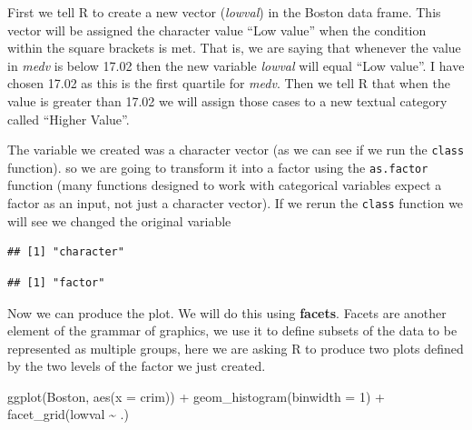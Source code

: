 \documentclass[
]{book}
\newenvironment{Shaded}{\begin{snugshade}}{\end{snugshade}}
\newcommand{\AttributeTok}[1]{\textcolor[rgb]{0.77,0.63,0.00}{#1}}
\newcommand{\DecValTok}[1]{\textcolor[rgb]{0.00,0.00,0.81}{#1}}
\newcommand{\FunctionTok}[1]{\textcolor[rgb]{0.00,0.00,0.00}{#1}}
\newcommand{\NormalTok}[1]{#1}
\newcommand{\OtherTok}[1]{\textcolor[rgb]{0.56,0.35,0.01}{#1}}
\newcommand{\SpecialCharTok}[1]{\textcolor[rgb]{0.00,0.00,0.00}{#1}}
\begin{document}
First we tell R to create a new vector (\emph{lowval}) in the Boston data frame. This vector will be assigned the character value ``Low value'' when the condition within the square brackets is met. That is, we are saying that whenever the value in \emph{medv} is below 17.02 then the new variable \emph{lowval} will equal ``Low value''. I have chosen 17.02 as this is the first quartile for \emph{medv}. Then we tell R that when the value is greater than 17.02 we will assign those cases to a new textual category called ``Higher Value''.

The variable we created was a character vector (as we can see if we run the \texttt{class} function). so we are going to transform it into a factor using the \texttt{as.factor} function (many functions designed to work with categorical variables expect a factor as an input, not just a character vector). If we rerun the \texttt{class} function we will see we changed the original variable

\begin{Shaded}
\end{Shaded}

\begin{verbatim}
## [1] "character"
\end{verbatim}

\begin{Shaded}
\end{Shaded}

\begin{verbatim}
## [1] "factor"
\end{verbatim}

Now we can produce the plot. We will do this using \textbf{facets}. Facets are another element of the grammar of graphics, we use it to define subsets of the data to be represented as multiple groups, here we are asking R to produce two plots defined by the two levels of the factor we just created.

\begin{Shaded}
\begin{Highlighting}[]
\FunctionTok{ggplot}\NormalTok{(Boston, }\FunctionTok{aes}\NormalTok{(}\AttributeTok{x =}\NormalTok{ crim)) }\SpecialCharTok{+}
  \FunctionTok{geom\_histogram}\NormalTok{(}\AttributeTok{binwidth =} \DecValTok{1}\NormalTok{) }\SpecialCharTok{+}
  \FunctionTok{facet\_grid}\NormalTok{(lowval }\SpecialCharTok{\textasciitilde{}}\NormalTok{ .) }
\end{Highlighting}
\end{Shaded}
\end{document}
